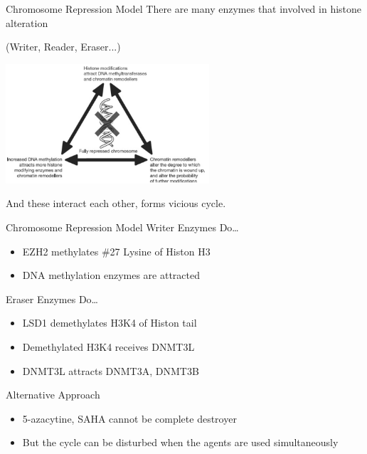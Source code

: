 \documentclass{beamer}
\begin{document}
    \begin{frame}{Chromosome Repression Model}
        There are many enzymes that involved in histone alteration

        (Writer, Reader, Eraser...)

        \begin{center}
        \includegraphics[height=12em]{model}
        \end{center}

        And these interact each other, forms vicious cycle.
    \end{frame}

    \begin{frame}{Chromosome Repression Model}
        Writer Enzymes Do\dots
            \begin{itemize}
                \item EZH2 methylates \#27 Lysine of Histon H3
                \item DNA methylation enzymes are attracted
            \end{itemize}
        Eraser Enzymes Do\dots
            \begin{itemize}
                \item LSD1 demethylates H3K4 of Histon tail
                \item Demethylated H3K4 receives DNMT3L
                \item DNMT3L attracts DNMT3A, DNMT3B
            \end{itemize}
    \end{frame}

    \begin{frame}{Alternative Approach}
        
        \begin{itemize}
            \item 5-azacytine, SAHA cannot be complete destroyer
            \item But the cycle can be disturbed when the agents are used simultaneously
        \end{itemize}
        
    \end{frame}
\end{document}
